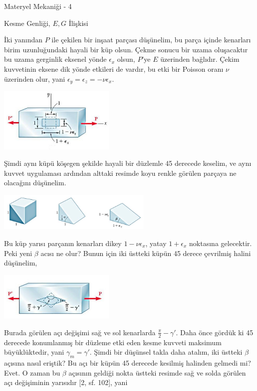 \documentclass[12pt,fleqn]{article}\usepackage{../../common}
\begin{document}
Materyel Mekaniği - 4

Kesme Genliği, $E,G$ İlişkisi

İki yanından $P$ ile çekilen bir inşaat parçası düşünelim, bu parça içinde
kenarları birim uzunluğundaki hayali bir küp olsun. Çekme sonucu bir uzama
oluşacaktır bu uzama gerginlik eksenel yönde $\epsilon_x$ olsun, $P$'ye
$E$ üzerinden bağlıdır. Çekim kuvvetinin eksene dik yönde etkileri de vardır,
bu etki bir Poisson oranı $\nu$ üzerinden olur, yani
$\epsilon_y = \epsilon_z = -\nu \epsilon_x$.

\includegraphics[width=15em]{phy_020_strs_06_07.jpg}

Şimdi aynı küpü köşegen şekilde hayali bir düzlemle 45 derecede keselim, ve aynı
kuvvet uygulaması ardından alttaki resimde koyu renkle görülen parçaya
ne olacağını düşünelim.

\includegraphics[width=20em]{phy_020_strs_06_08.jpg}

Bu küp yarısı parçanın kenarları dikey $1-\nu \epsilon_x$, yatay $1 + \epsilon_x$
noktasına gelecektir. Peki yeni $\beta$ acısı ne olur? Bunun için iki
üstteki küpün 45 derece çevrilmiş halini düşünelim,

\includegraphics[width=15em]{phy_020_strs_06_09.jpg}

Burada görülen açı değişimi sağ ve sol kenarlarda $\frac{\pi}{2} - \gamma'$.
Daha önce gördük ki 45 derecede konumlanmış bir düzleme etki eden kesme
kuvveti maksimum büyüklüktedir, yani $\gamma_m = \gamma'$. Şimdi bir düşünsel
takla daha atalım, iki üstteki $\beta$ açısına nasıl eriştik? Bu açı bir küpün
45 derecede kesilmiş halinden gelmedi mi? Evet. O zaman bu $\beta$ açısının
geldiği nokta üstteki resimde sağ ve solda görülen açı değişiminin yarısıdır
[2, sf. 102], yani
\end{document}
